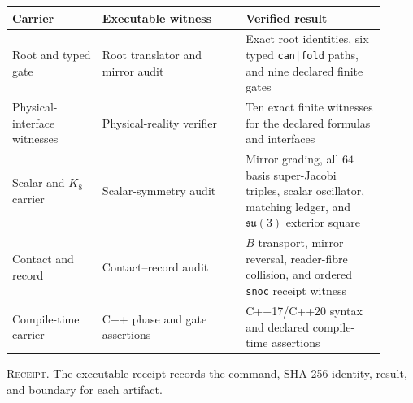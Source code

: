 \begin{center}
\small
\begin{tabular}{@{}L{0.22\linewidth}L{0.35\linewidth}L{0.34\linewidth}@{}}
\toprule
\textbf{Carrier} & \textbf{Executable witness} & \textbf{Verified result}\\
\midrule
Root and typed gate & Root translator and mirror audit & Exact root identities, six typed \texttt{can|fold} paths, and nine declared finite gates\\
\addlinespace
Physical-interface witnesses & Physical-reality verifier & Ten exact finite witnesses for the declared formulas and interfaces\\
\addlinespace
Scalar and $K_8$ carrier & Scalar-symmetry audit & Mirror grading, all $64$ basis super-Jacobi triples, scalar oscillator, matching ledger, and $\mathfrak{su}(3)$ exterior square\\
\addlinespace
Contact and record & Contact--record audit & $B$ transport, mirror reversal, reader-fibre collision, and ordered \texttt{snoc} receipt witness\\
\addlinespace
Compile-time carrier & C++ phase and gate assertions & C++17/C++20 syntax and declared compile-time assertions\\
\bottomrule
\end{tabular}
\par\smallskip
\textsc{Receipt.} The executable receipt records the command, SHA-256 identity, result, and boundary for each artifact.
\end{center}

